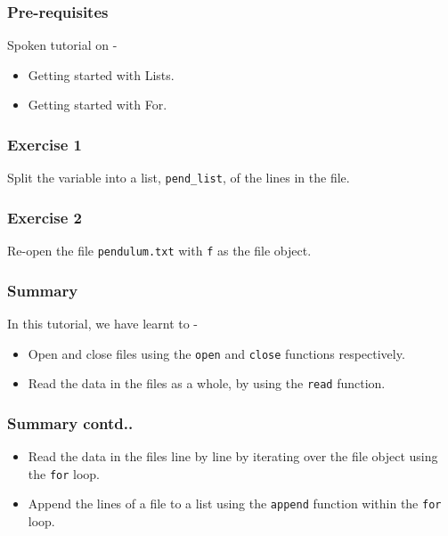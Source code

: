 \documentclass[17pt,compress]{beamer}
\begin{document}
\begin{frame}
\frametitle{Pre-requisites}
\label{sec-3}

  Spoken tutorial on -

\begin{itemize}
\item Getting started with Lists.\pause
\item Getting started with For.
\end{itemize}
\end{frame}
\begin{frame}
\frametitle{Exercise 1}
\label{sec-4}

  Split the variable into a list, \texttt{pend\_list}, of the lines in the
  file.
\end{frame}
\begin{frame}
\frametitle{Exercise 2}
\label{sec-5}

  Re-open the file \texttt{pendulum.txt} with \texttt{f} as the file object.
\end{frame}
\begin{frame}
\frametitle{Summary}
\label{sec-6.1}

  In this tutorial, we have learnt to -

\begin{itemize}
\item Open and close files using the \texttt{open} and \texttt{close} functions respectively.
\item Read the data in the files as a whole, by using the \texttt{read} function.
\end{itemize}
\end{frame}
\begin{frame}
\frametitle{Summary contd..}
\label{sec-6.2}

\begin{itemize}
\item Read the data in the files line by line by iterating over the file object using the \texttt{for} loop.
\item Append the lines of a file to a list using the \texttt{append} function within the \texttt{for} loop.
\end{itemize}
\end{frame}
\end{document}
